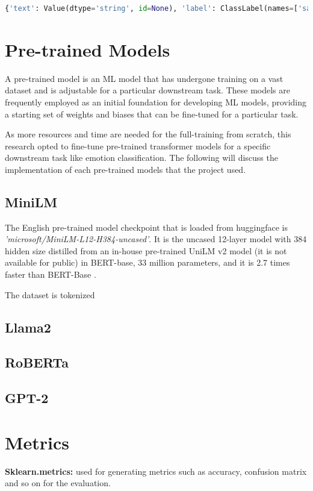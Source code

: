 \lstset{style=mystyle}
\begin{lstlisting}[language=Python, caption=Features of the dataset]
{'text': Value(dtype='string', id=None), 'label': ClassLabel(names=['sadness', 'joy', 'love', 'anger', 'fear', 'surprise'], id=None)}
\end{lstlisting}


\section{Pre-trained Models}

A pre-trained model is an ML model that has undergone training on a vast dataset and is adjustable for a particular downstream task. These models are frequently employed as an initial foundation for developing ML models, providing a starting set of weights and biases that can be fine-tuned for a particular task.

As more resources and time are needed for the full-training from scratch, this research opted to fine-tune pre-trained transformer models for a specific downstream task like emotion classification. The following will discuss the implementation of each pre-trained models that the project used.

\subsection{MiniLM}
The English pre-trained model checkpoint that is loaded from huggingface is \textit{'microsoft/MiniLM-L12-H384-uncased'}. It is the uncased 12-layer model with 384 hidden size distilled from an in-house pre-trained UniLM v2 model (it is not available for public) in BERT-base, 33 million parameters, and it is 2.7 times faster than BERT-Base \cite{patrickvonplaten}.

The dataset is tokenized 


\subsection{Llama2}
  
\subsection{RoBERTa}

\subsection{GPT-2}


\section{Metrics}

\textbf{Sklearn.metrics:} used for generating metrics such as accuracy, confusion matrix and so on for the evaluation.
